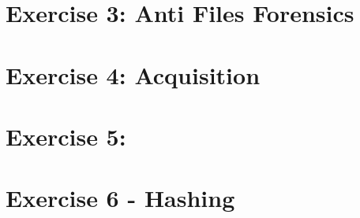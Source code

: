 \documentclass[a5paper,10pt,oneside]{article}
\begin{document}
\section{Exercise 3: Anti Files Forensics}
\section{Exercise 4: Acquisition}
\section{Exercise 5: }
\section{Exercise 6 - Hashing}

%
%
\end{document}
